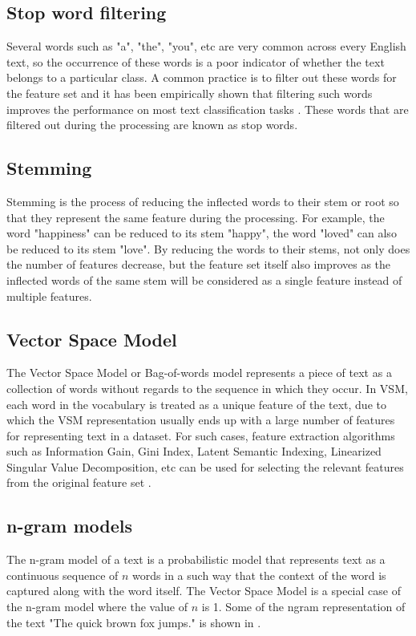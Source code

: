 \subsection{Stop word filtering}
Several words such as "a", "the", "you", etc are very common across every English text, so the occurrence of these words is a poor indicator of whether the text belongs to a particular class. A common practice is to filter out these words for the feature set and it has been empirically shown that filtering such words improves the performance on most text classification tasks \cite{silva2003importance}. These words that are filtered out during the processing are known as stop words. 

\subsection{Stemming}
Stemming is the process of reducing the inflected words to their stem or root so that they represent the same feature during the processing. For example, the word "happiness" can be reduced to its stem "happy", the word "loved" can also be reduced to its stem "love". By reducing the words to their stems, not only does the number of features decrease, but the feature set itself also improves as the inflected words of the same stem will be considered as a single feature instead of multiple features. 

\subsection{Vector Space Model}
The Vector Space Model or Bag-of-words model represents a piece of text as a collection of words without regards to the sequence in which they occur. In VSM, each word in the vocabulary is treated as a unique feature of the text, due to which the VSM representation usually ends up with a large number of features for representing text in a dataset. For such cases, feature extraction algorithms such as Information Gain, Gini Index, Latent Semantic Indexing, Linearized Singular Value Decomposition, etc can be used for selecting the relevant features from the original feature set \cite{aggarwal2012survey}.

\subsection{n-gram models}
The n-gram model of a text is a probabilistic model that represents text as a continuous sequence of $n$ words in a such way that the context of the word is captured along with the word itself. The Vector Space Model is a special case of the n-gram model where the value of $n$ is 1. Some of the ngram representation of the text "The quick brown fox jumps." is shown in .

